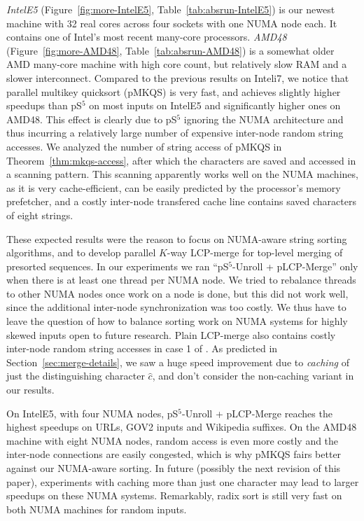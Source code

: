 \documentclass[a4paper]{myjournal}
\begin{document}
\emph{IntelE5} (Figure~\ref{fig:more-IntelE5}, Table~\ref{tab:absrun-IntelE5}) is our newest machine with 32
real cores across four sockets with one NUMA node each. It contains one of
Intel's most recent many-core processors. \emph{AMD48}
(Figure~\ref{fig:more-AMD48}, Table~\ref{tab:absrun-AMD48}) is a somewhat older AMD many-core machine with
high core count, but relatively slow RAM and a slower interconnect.  Compared to
the previous results on Inteli7, we notice that parallel multikey quicksort (pMKQS) is very
fast, and achieves slightly higher speedups than pS$^5$ on most inputs on
IntelE5 and significantly higher ones on AMD48.  This effect is clearly due to
pS$^5$ ignoring the NUMA architecture and thus incurring a relatively large
number of expensive inter-node random string accesses. We analyzed the number of
string access of pMKQS in Theorem~\ref{thm:mkqs-access}, after which the
characters are saved and accessed in a scanning pattern. This scanning
apparently works well on the NUMA machines, as it is very cache-efficient, can
be easily predicted by the processor's memory prefetcher, and a costly
inter-node transfered cache line contains saved characters of eight strings.

These expected results were the reason to focus on NUMA-aware string sorting
algorithms, and to develop parallel $K$-way LCP-merge for top-level merging of
presorted sequences. In our experiments we ran ``pS$^5$-Unroll + pLCP-Merge''
only when there is at least one thread per NUMA node. We tried to rebalance
threads to other NUMA nodes once work on a node is done, but this did not work
well, since the additional inter-node synchronization was too costly. We thus
have to leave the question of how to balance sorting work on NUMA systems for
highly skewed inputs open to future research.  Plain LCP-merge also contains
costly inter-node random string accesses in case 1 of \LCPCompare. As predicted
in Section~\ref{sec:merge-details}, we saw a huge speed improvement due to
\emph{caching} of just the distinguishing character $\hat{c}$, and don't
consider the non-caching variant in our results.

On IntelE5, with four NUMA nodes, pS$^5$-Unroll + pLCP-Merge reaches the highest
speedups on URLs, GOV2 inputs and Wikipedia suffixes. On the AMD48 machine with
eight NUMA nodes, random access is even more costly and the inter-node
connections are easily congested, which is why pMKQS fairs better against our
NUMA-aware sorting.  In future (possibly the next revision of this
paper), experiments with caching more than just one character may lead to larger
speedups on these NUMA systems. Remarkably, radix sort is still very fast on
both NUMA machines for random inputs.
\end{document}
